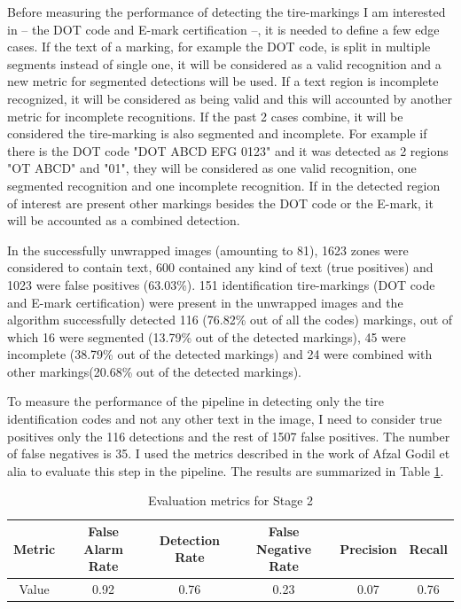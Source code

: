Before measuring the performance of detecting the tire-markings I am interested in -- the DOT code and E-mark certification --, it is needed to define a few edge cases. If the text of a marking, for example the DOT code, is split in multiple segments instead of single one, it will be considered as a valid recognition and a new metric for segmented detections will be used. If a text region is incomplete recognized, it will be considered as being valid and this will accounted by another metric for incomplete recognitions. If the past 2 cases combine, it will be considered the tire-marking is also segmented and incomplete. For example if there is the DOT code "DOT ABCD EFG 0123" and it was detected as 2 regions "OT ABCD" and "01", they will be considered as one valid recognition, one segmented recognition and one incomplete recognition. If in the detected region of interest are present other markings besides the DOT code or the E-mark, it will be accounted as a combined detection.


In the successfully unwrapped images (amounting to 81), 1623 zones were considered to contain text, 600 contained any kind of text (true positives) and 1023 were false positives (63.03\%). 151 identification tire-markings (DOT code and E-mark certification) were present in the unwrapped images and the algorithm successfully detected 116 (76.82\% out of all the codes) markings, out of which 16 were segmented (13.79\% out of the detected markings), 45 were incomplete (38.79\% out of the detected markings) and 24 were combined with other markings(20.68\% out of the detected markings).

To measure the performance of the pipeline in detecting only the tire identification codes and not any other text in the image, I need to consider true positives only the 116 detections and the rest of 1507 false positives. The number of false negatives is 35. I used the metrics described in the work of Afzal Godil et alia \cite{article:evaluation-metrics} to evaluate this step in the pipeline. The results are summarized in Table \ref{tab:evaluation_metrics-stage2}.

\begin{table}
    \begin{tabular}{|c|c|c|c|c|c|}
    \hline
    Metric & False Alarm Rate & Detection Rate & False Negative Rate & Precision & Recall \\ \hline
    Value  & 0.92             & 0.76           & 0.23                & 0.07      & 0.76   \\ \hline
    \end{tabular}
    \caption{Evaluation metrics for Stage 2}
    \label{tab:evaluation_metrics-stage2}
\end{table}

